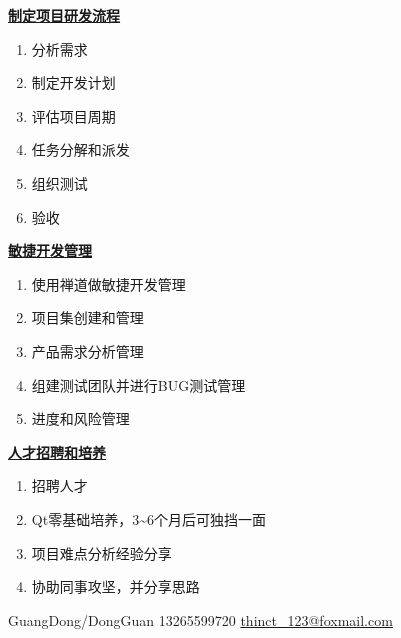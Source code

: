 \documentclass[lighthipster]{simplehipstercv}
\newlength{\rightcolwidth}
\begin{document}
\begin{paracol}{2}
\begin{minipage}[t]{0.7\textwidth}
			\begin{minipage}[t]{\textwidth}
				\begin{minipage}[t]{0.25\textwidth}
					\textbf{\underline{制定项目研发流程}}
					\begin{enumerate}
						\item 分析需求
						\item 制定开发计划
						\item 评估项目周期
						\item 任务分解和派发
						\item 组织测试
						\item 验收
					\end{enumerate}
				\end{minipage} 
				\hfill
				\begin{minipage}[t]{0.33\textwidth}
					\textbf{\underline{敏捷开发管理}}
					\begin{enumerate}
						\item 使用禅道做敏捷开发管理
						\item 项目集创建和管理
						\item 产品需求分析管理
						\item 组建测试团队并进行BUG测试管理
						\item 进度和风险管理
					\end{enumerate}
				\end{minipage} 
				\hfill
				\begin{minipage}[t]{0.35\textwidth}
					\textbf{\underline{人才招聘和培养}}
					\begin{enumerate}
						\item 招聘人才
						\item Qt零基础培养，3\textasciitilde6个月后可独挡一面
						\item 项目难点分析经验分享
						\item 协助同事攻坚，并分享思路
					\end{enumerate}
				\end{minipage}
				\bigskip
			\end{minipage}
		\end{minipage}
		
		
		\vspace{1em}
		
		\vfill{} %
		
		\setlength{\parindent}{0pt}
		\begin{minipage}[t]{\rightcolwidth}
			\begin{center}\fontfamily{\sfdefault}\selectfont \color{black!70}
				{ GuangDong/DongGuan  13265599720  \protect\url{thinct_123@foxmail.com}
				}
			\end{center}
		\end{minipage}
		
	\end{paracol}
	
\end{document}
